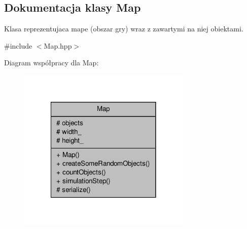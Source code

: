 \hypertarget{classMap}{\subsection{Dokumentacja klasy Map}
\label{classMap}
}


Klasa reprezentujaca mape (obszar gry) wraz z zawartymi na niej obiektami.  




{\ttfamily \#include $<$Map.\-hpp$>$}



Diagram współpracy dla Map\-:
\nopagebreak
\begin{figure}[H]
\begin{center}
\leavevmode
\includegraphics[width=234pt]{classMap__coll__graph}
\end{center}
\end{figure}
